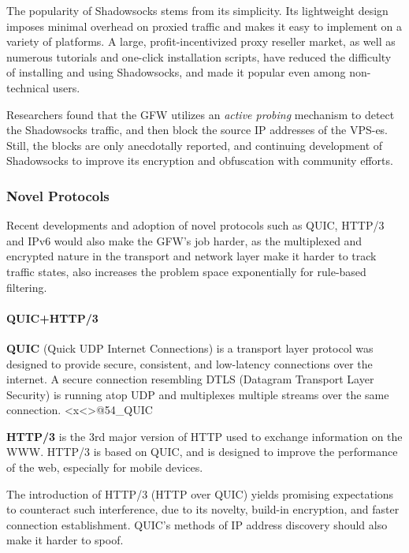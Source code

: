 The popularity of Shadowsocks stems from its simplicity. Its lightweight
design imposes minimal overhead on proxied traffic and makes it easy to
implement on a variety of platforms. A large, profit-incentivized proxy
reseller market, as well as numerous tutorials and one-click
installation scripts, have reduced the difficulty of installing and
using Shadowsocks, and made it popular even among non-technical users.

Researchers found that the GFW utilizes an \emph{active probing}
mechanism to detect the Shadowsocks traffic, and then block the source
IP addresses of the VPS-es. \cite{40_SSProbe} Still, the blocks are only
anecdotally reported, and continuing development of Shadowsocks to
improve its encryption and obfuscation with community efforts.

\hypertarget{novel-protocols}{%
\subsubsection{Novel Protocols}\label{novel-protocols}}

Recent developments and adoption of novel protocols such as QUIC, HTTP/3
and IPv6 would also make the GFW's job harder, as the multiplexed and
encrypted nature in the transport and network layer make it harder to
track traffic states, also increases the problem space exponentially for
rule-based filtering.

\hypertarget{quichttp3}{%
\paragraph{QUIC+HTTP/3}\label{quichttp3}}

\textbf{QUIC} (Quick UDP Internet Connections) is a transport layer
protocol was designed to provide secure, consistent, and low-latency
connections over the internet. A secure connection resembling DTLS
(Datagram Transport Layer Security) is running atop UDP and multiplexes
multiple streams over the same connection.
\textless x\textless\textgreater{}@54\_QUIC

\textbf{HTTP/3} is the 3rd major version of HTTP used to exchange
information on the WWW. HTTP/3 is based on QUIC, and is designed to
improve the performance of the web, especially for mobile devices.
\cite{55_HTTP3}

The introduction of HTTP/3 (HTTP over QUIC) yields promising
expectations to counteract such interference, due to its novelty,
build-in encryption, and faster connection establishment. QUIC's methods
of IP address discovery should also make it harder to spoof.

